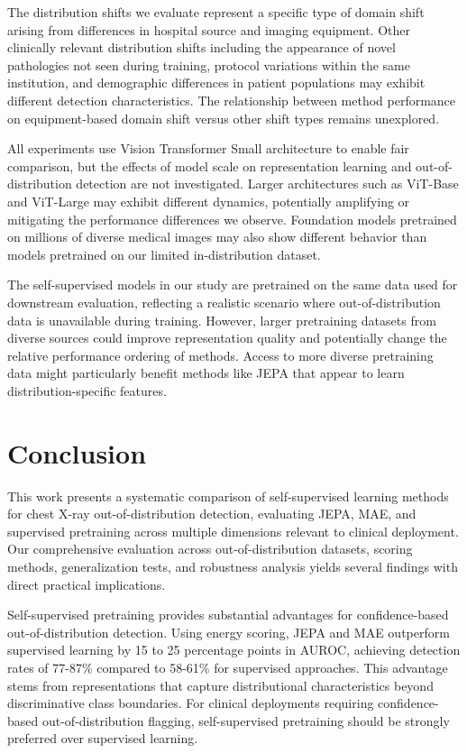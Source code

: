 \documentclass[11pt,a4paper]{article}
\begin{document}
The distribution shifts we evaluate represent a specific type of domain shift arising from differences in hospital source and imaging equipment. Other clinically relevant distribution shifts including the appearance of novel pathologies not seen during training, protocol variations within the same institution, and demographic differences in patient populations may exhibit different detection characteristics. The relationship between method performance on equipment-based domain shift versus other shift types remains unexplored.

All experiments use Vision Transformer Small architecture to enable fair comparison, but the effects of model scale on representation learning and out-of-distribution detection are not investigated. Larger architectures such as ViT-Base and ViT-Large may exhibit different dynamics, potentially amplifying or mitigating the performance differences we observe. Foundation models pretrained on millions of diverse medical images may also show different behavior than models pretrained on our limited in-distribution dataset.

The self-supervised models in our study are pretrained on the same data used for downstream evaluation, reflecting a realistic scenario where out-of-distribution data is unavailable during training. However, larger pretraining datasets from diverse sources could improve representation quality and potentially change the relative performance ordering of methods. Access to more diverse pretraining data might particularly benefit methods like JEPA that appear to learn distribution-specific features.

\section{Conclusion}

This work presents a systematic comparison of self-supervised learning methods for chest X-ray out-of-distribution detection, evaluating JEPA, MAE, and supervised pretraining across multiple dimensions relevant to clinical deployment. Our comprehensive evaluation across out-of-distribution datasets, scoring methods, generalization tests, and robustness analysis yields several findings with direct practical implications.

Self-supervised pretraining provides substantial advantages for confidence-based out-of-distribution detection. Using energy scoring, JEPA and MAE outperform supervised learning by 15 to 25 percentage points in AUROC, achieving detection rates of 77-87\% compared to 58-61\% for supervised approaches. This advantage stems from representations that capture distributional characteristics beyond discriminative class boundaries. For clinical deployments requiring confidence-based out-of-distribution flagging, self-supervised pretraining should be strongly preferred over supervised learning.
\end{document}
